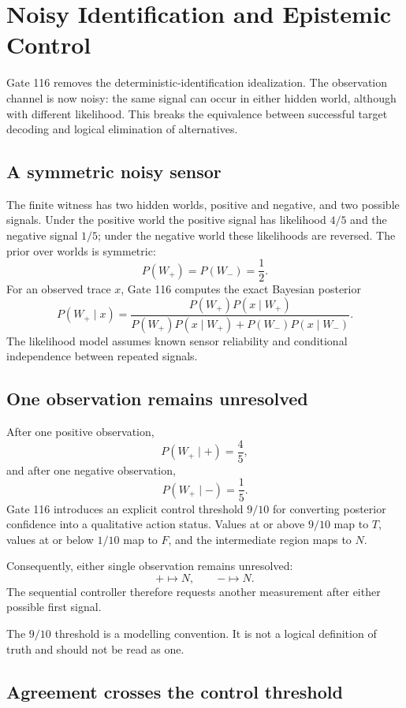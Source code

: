 \section{Noisy Identification and Epistemic Control}

Gate 116 removes the deterministic-identification idealization. The observation channel is now noisy: the same signal can occur in either hidden world, although with different likelihood. This breaks the equivalence between successful target decoding and logical elimination of alternatives.

\subsection{A symmetric noisy sensor}

The finite witness has two hidden worlds, positive and negative, and two possible signals. Under the positive world the positive signal has likelihood $4/5$ and the negative signal $1/5$; under the negative world these likelihoods are reversed. The prior over worlds is symmetric:
\[
P(W_+)=P(W_-)=\frac12.
\]
For an observed trace $x$, Gate 116 computes the exact Bayesian posterior
\[
P(W_+\mid x)
=
\frac{P(W_+)P(x\mid W_+)}
{P(W_+)P(x\mid W_+)+P(W_-)P(x\mid W_-)}.
\]
The likelihood model assumes known sensor reliability and conditional independence between repeated signals.

\subsection{One observation remains unresolved}

After one positive observation,
\[
P(W_+\mid +)=\frac45,
\]
and after one negative observation,
\[
P(W_+\mid -)=\frac15.
\]
Gate 116 introduces an explicit control threshold $9/10$ for converting posterior confidence into a qualitative action status. Values at or above $9/10$ map to $T$, values at or below $1/10$ map to $F$, and the intermediate region maps to $N$.

Consequently, either single observation remains unresolved:
\[
+\mapsto N,
\qquad
-\mapsto N.
\]
The sequential controller therefore requests another measurement after either possible first signal.

The $9/10$ threshold is a modelling convention. It is not a logical definition of truth and should not be read as one.

\subsection{Agreement crosses the control threshold}

